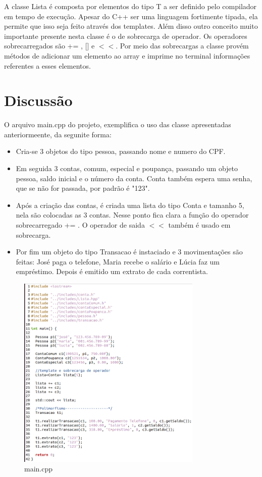 \documentclass[conference]{IEEEtran}
\begin{document}
A classe Lista é composta por elementos do tipo T a ser definido pelo compilador em tempo de execução. Apesar do C++ ser uma linguagem fortimente tipada, ela permite que isso seja feito através dos templates. Além disso outro conceito muito importante presente nesta classe é o de sobrecarga de operador. Os operadores sobrecarregados são += , [] e $ << $. Por meio das sobrecargas a classe provém métodos de adicionar um elemento ao array e imprime no terminal informações referentes a esses elementos.


\section{Discussão}
O arquivo main.cpp do projeto, exemplifica o uso das classe apresentadas anteriormeente, da segunite forma:
\begin{itemize}
    \item Cria-se 3 objetos do tipo pessoa, passando nome e numero do CPF.
    \item Em seguida 3 contas, comum, especial e poupança, passando um objeto pessoa, saldo inicial e o número da conta. Conta também espera uma senha, que se não for passada, por padrão é "123".
    \item Após a criação das contas, é criada uma lista do tipo Conta e tamanho 5, nela são colocadas as 3 contas. Nesse ponto fica clara a função do operador sobrecarregado += . O operador de saida $<<$ também é usado em sobrecarga.
    \item Por fim um objeto do tipo Transacao é instaciado e 3 movimentações são feitas: José paga o telefone, Maria recebe o salário e Lúcia faz um empréstimo. Depois é emitido um extrato de cada correntista.
    \end{itemize}
    \begin{figure}[htbp]
        \centering
        \includegraphics[width=8.8cm]{../img/main.png}
        \caption{main.cpp}
        \label{fig_main}
    \end{figure}
\end{document}
